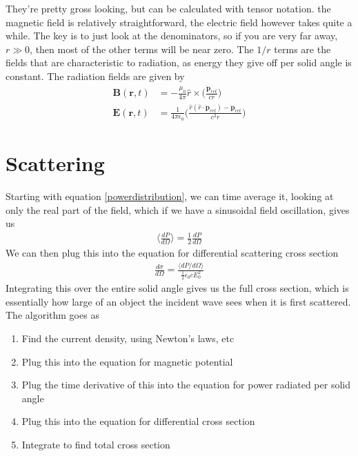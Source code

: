They're pretty gross looking, but can be calculated with tensor notation. the magnetic field is relatively straightforward, the electric field however takes quite a while. The key is to just look at the denominators, so if you are very far away, $r\gg 0$, then most of the other terms will be near zero. The $1/r$ terms are the fields that are characteristic to radiation, as energy they give off per solid angle is constant. The radiation fields are given by
\begin{align}
    \textbf{B}(\textbf{r},t) &= -\frac{\mu_0}{4\pi}\hat{r}\times\Big(\frac{\ddot{\textbf{p}}_{ret}}{cr}\Big)\\
    \textbf{E}(\textbf{r},t) &= \frac{1}{4\pi\epsilon_0}\Big( \frac{\hat{r}(\hat{r}\cdot\ddot{\textbf{p}}_{ret})-\ddot{\textbf{p}}_{ret}}{c^2r}\Big)
\end{align}


 




\section{Scattering}
Starting with equation \ref{powerdistribution}, we can time average it, looking at only the real part of the field, which if we have a sinusoidal field oscillation, gives us
\begin{align}
    \Big\langle \frac{dP}{d\Omega}\Big\rangle = \frac{1}{2}\frac{dP}{d\Omega}
\end{align}
We can then plug this into the equation for differential scattering cross section
\begin{align}
 \frac{d\sigma}{d\Omega} = \frac{\langle dP/d\Omega\rangle}{\frac{1}{2}\epsilon_0c E_0^2}
 \end{align}
Integrating this over the entire solid angle gives us the full cross section, which is essentially how large of an object the incident wave sees when it is first scattered. The algorithm goes as
\begin{enumerate}
    \item Find the current density, using Newton's laws, etc
    \item Plug this into the equation for magnetic potential
    \item Plug the time derivative of this into the equation for power radiated per solid angle
    \item Plug this into the equation for differential cross section
    \item Integrate to find total cross section
\end{enumerate}


